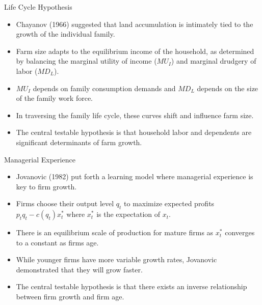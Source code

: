 \documentclass[xcolor=dvipsnames]{beamer}
\begin{document}
\begin{frame}{Life Cycle Hypothesis}
\begin{itemize}
\item Chayanov (1966) suggested that land accumulation is intimately tied to 
the growth of the individual family. 
\par\pause\noindent \item Farm size adapts to the equilibrium income of 
the household, as determined by balancing the marginal utility of income 
($MU_I$) and marginal drudgery of labor ($MD_L$). 
\par\pause\noindent \item  $MU_I$ depends on family consumption 
demands and $MD_L$ depends on the size of the family work force.
\par\pause\noindent \item In traversing the family life cycle, these curves 
shift and influence farm size.
\par\pause\noindent \item The central testable hypothesis is that household 
labor and dependents are significant determinants of farm growth.
\end{itemize}
\end{frame}

\begin{frame}{Managerial Experience}
\begin{itemize}
\item Jovanovic (1982) put forth a learning model where managerial 
experience is key to firm growth.
\par\pause\noindent \item Firms choose their output level $q_t$ to 
maximize expected profits $p_t q_t - c(q_t)x_t^*$ where $x_t^*$ is the 
expectation of $x_t$. 
\par\pause\noindent \item There is an equilibrium scale of production for 
mature firms as $x_t^*$ converges to a constant as firms age.
\par\pause\noindent \item While younger firms have more variable 
growth rates, Jovanovic demonstrated that they will grow faster.
\par\pause\noindent \item The central testable hypothesis is that there 
exists an inverse relationship between firm growth and firm age.
\end{itemize}
\end{frame}
\end{document}
